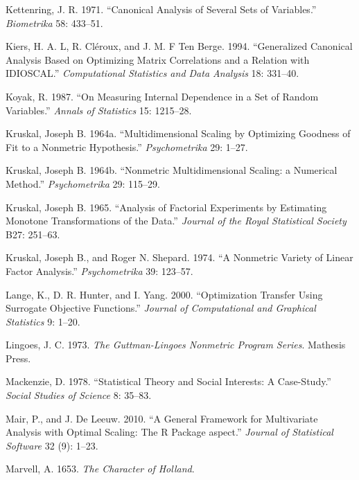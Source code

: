 \documentclass[
  12pt,
  letterpaper,
  DIV=11,
  numbers=noendperiod]{scrreprt}
\newlength{\cslhangindent}
\newenvironment{CSLReferences}[2] %
 {\begin{list}{}{%
  \setlength{\itemindent}{0pt}
  \setlength{\leftmargin}{0pt}
  \setlength{\parsep}{0pt}
  \ifodd #1
   \setlength{\leftmargin}{\cslhangindent}
   \setlength{\itemindent}{-1\cslhangindent}
  \fi
  \setlength{\itemsep}{#2\baselineskip}}}
 {\end{list}}
\begin{document}
\begin{CSLReferences}{1}{1}
Kettenring, J. R. 1971. {``{Canonical Analysis of Several Sets of
Variables}.''} \emph{Biometrika} 58: 433--51.

Kiers, H. A. L, R. Cléroux, and J. M. F Ten Berge. 1994. {``{Generalized
Canonical Analysis Based on Optimizing Matrix Correlations and a
Relation with IDIOSCAL}.''} \emph{Computational Statistics and Data
Analysis} 18: 331--40.

Koyak, R. 1987. {``{On Measuring Internal Dependence in a Set of Random
Variables}.''} \emph{Annals of Statistics} 15: 1215--28.

Kruskal, Joseph B. 1964a. {``{Multidimensional Scaling by Optimizing
Goodness of Fit to a Nonmetric Hypothesis}.''} \emph{Psychometrika} 29:
1--27.

Kruskal, Joseph B. 1964b. {``{Nonmetric Multidimensional Scaling: a
Numerical Method}.''} \emph{Psychometrika} 29: 115--29.

Kruskal, Joseph B. 1965. {``{Analysis of Factorial Experiments by
Estimating Monotone Transformations of the Data}.''} \emph{Journal of
the Royal Statistical Society} B27: 251--63.

Kruskal, Joseph B., and Roger N. Shepard. 1974. {``{A Nonmetric Variety
of Linear Factor Analysis}.''} \emph{Psychometrika} 39: 123--57.

Lange, K., D. R. Hunter, and I. Yang. 2000. {``{Optimization Transfer
Using Surrogate Objective Functions}.''} \emph{Journal of Computational
and Graphical Statistics} 9: 1--20.

Lingoes, J. C. 1973. \emph{{The Guttman-Lingoes Nonmetric Program
Series}}. Mathesis Press.

Mackenzie, D. 1978. {``{Statistical Theory and Social Interests: A
Case-Study}.''} \emph{Social Studies of Science} 8: 35--83.

Mair, P., and J. De Leeuw. 2010. {``{A General Framework for
Multivariate Analysis with Optimal Scaling: The {R} Package aspect}.''}
\emph{Journal of Statistical Software} 32 (9): 1--23.

Marvell, A. 1653. \emph{The Character of Holland}.


\end{CSLReferences}
\end{document}
